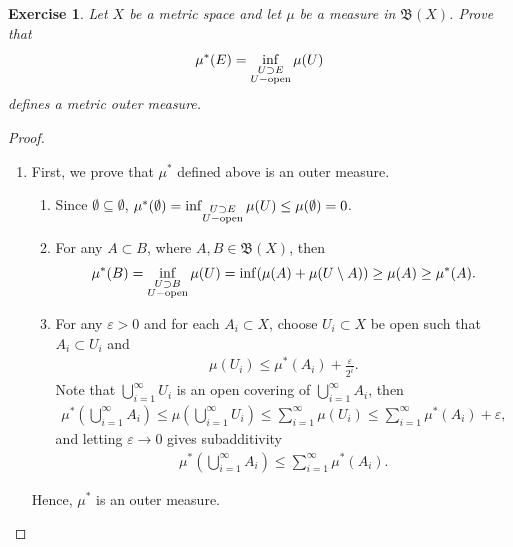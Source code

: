 \documentclass[11pt]{book}
\newtheorem{exercise}{Exercise}[section]
\theoremstyle{definition}
\numberwithin{equation}{chapter}
\def\BB{\mathfrak{B}}
\begin{document}
\medskip

\begin{exercise}
Let $X$ be a metric space and let $\mu$ be a measure in $\BB(X)$. Prove that
$$
\mu^*(E) =
\inf_{\substack{U\supset E \\ U - {\rm open}}}\mu(U)
$$
defines a metric outer measure.
\end{exercise}
\begin{proof}
~\begin{enumerate}[label=(\alph*)]
    \item First, we prove that $\mu^*$ defined above is an outer measure.
    \begin{enumerate}[label=\arabic*)]
        \item Since $\emptyset \subseteq \emptyset$, $\mu^*(\emptyset) = \inf_{\substack{U\supset E \\ U - {\rm open}}}\mu(U) \leq \mu(\emptyset) = 0$.
        
        \item For any $A \subset B$, where $A, B \in \mathfrak{B}(X)$, then
        \begin{align*}
            \mu^*(B) = \inf_{\substack{U\supset B \\ U - {\rm open}}}\mu(U) = \inf (\mu(A) + \mu(U \setminus A)) \geq \mu(A) \geq \mu^*(A).
        \end{align*}
        
        \item For any $\varepsilon > 0$ and for each $A_i \subset X$, choose $U_i \subset X$ be open such that $A_i \subset U_i$ and
        \begin{align*}
            \mu(U_i) \leq \mu^*(A_i) + \frac{\varepsilon}{2^i}.
        \end{align*}
        Note that $\bigcup^\infty_{i=1} U_i$ is an open covering of $\bigcup^\infty_{i=1} A_i$, then 
        \begin{align*}
            \mu^*\left(\bigcup^\infty_{i=1} A_i\right) \leq \mu \left( \bigcup^\infty_{i=1} U_i\right) \leq \sum^\infty_{i=1} \mu(U_i) \leq \sum^\infty_{i=1} \mu^*(A_i) + \varepsilon,
        \end{align*}
        and letting $\varepsilon \to 0$ gives subadditivity
        \begin{align*}
            \mu^*\left(\bigcup^\infty_{i=1} A_i\right) \leq \sum^\infty_{i=1} \mu^*(A_i).
        \end{align*}
    \end{enumerate}
    Hence, $\mu^*$ is an outer measure.
    

\end{enumerate}
\end{proof}
\end{document}
